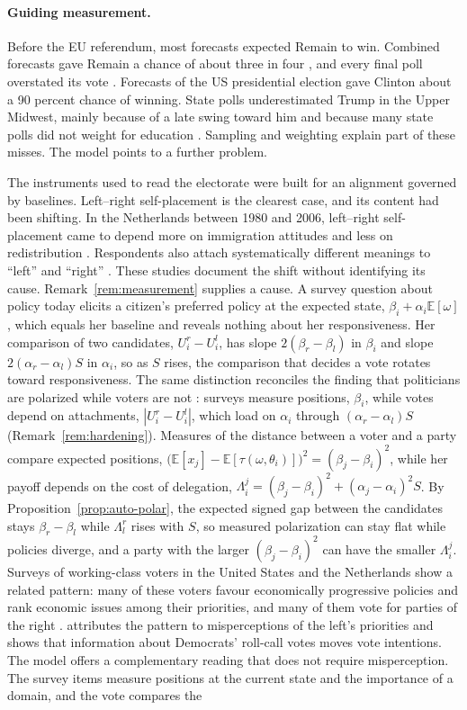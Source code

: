 \documentclass[12pt,letterpaper]{article}
\begin{document}
\paragraph{Guiding measurement.}
Before the EU referendum, most forecasts expected Remain to win. Combined forecasts gave Remain a chance of about three in four \citep{FisherShorrocks2016}, and every final poll overstated its vote \citep{BPC2016}. Forecasts of the US presidential election gave Clinton about a 90 percent chance of winning. State polls underestimated Trump in the Upper Midwest, mainly because of a late swing toward him and because many state polls did not weight for education \citep{Kennedy2018}. Sampling and weighting explain part of these misses. The model points to a further problem.

The instruments used to read the electorate were built for an alignment governed by baselines. Left--right self-placement is the clearest case, and its content had been shifting. In the Netherlands between 1980 and 2006, left--right self-placement came to depend more on immigration attitudes and less on redistribution \citep{deVries2013}. Respondents also attach systematically different meanings to ``left'' and ``right'' \citep{Bauer2017}. These studies document the shift without identifying its cause. Remark~\ref{rem:measurement} supplies a cause. A survey question about policy today elicits a citizen's preferred policy at the expected state, $\beta_i+\alpha_i\mathbb{E}[\omega]$, which equals her baseline and reveals nothing about her responsiveness. Her comparison of two candidates, $U_i^r-U_i^l$, has slope $2(\beta_r-\beta_l)$ in $\beta_i$ and slope $2(\alpha_r-\alpha_l)S$ in $\alpha_i$, so as $S$ rises, the comparison that decides a vote rotates toward responsiveness. The same distinction reconciles the finding that politicians are polarized while voters are not \citep{FiorinaAbrams2009}: surveys measure positions, $\beta_i$, while votes depend on attachments, $|U_i^r-U_i^l|$, which load on $\alpha_i$ through $(\alpha_r-\alpha_l)S$ (Remark~\ref{rem:hardening}). Measures of the distance between a voter and a party compare expected positions, $\big(\mathbb{E}[x_j]-\mathbb{E}[\tau(\omega,\theta_i)]\big)^2=(\beta_j-\beta_i)^2$, while her payoff depends on the cost of delegation, $\Lambda_i^j=(\beta_j-\beta_i)^2+(\alpha_j-\alpha_i)^2S$. By Proposition~\ref{prop:auto-polar}, the expected signed gap between the candidates stays $\beta_r-\beta_l$ while $\Lambda_l^r$ rises with $S$, so measured polarization can stay flat while policies diverge, and a party with the larger $(\beta_j-\beta_i)^2$ can have the smaller $\Lambda_i^j$. Surveys of working-class voters in the United States and the Netherlands show a related pattern: many of these voters favour economically progressive policies and rank economic issues among their priorities, and many of them vote for parties of the right \citep{Kamphorst2025}. \citet{Kamphorst2025} attributes the pattern to misperceptions of the left's priorities and shows that information about Democrats' roll-call votes moves vote intentions. The model offers a complementary reading that does not require misperception. The survey items measure positions at the current state and the importance of a domain, and the vote compares the 
\end{document}
